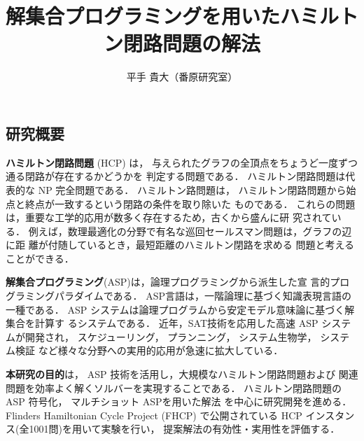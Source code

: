 \documentclass[a4j,10pt]{jarticle}
\title{解集合プログラミングを用いたハミルトン閉路問題の解法}
\author{平手 貴大（番原研究室）}
\date{}
\begin{document}
\maketitle
\thispagestyle{empty}
\begin{multicols}{1}

\section{研究概要}
\textbf{ハミルトン閉路問題} (HCP) は，
与えられたグラフの全頂点をちょうど一度ずつ通る閉路が存在するかどうかを
判定する問題である．
ハミルトン閉路問題は代表的な NP 完全問題である．
ハミルトン路問題は，
ハミルトン閉路問題から始点と終点が一致するという閉路の条件を取り除いた
ものである．
これらの問題は，重要な工学的応用が数多く存在するため，古くから盛んに研
究されている．
例えば，数理最適化の分野で有名な巡回セールスマン問題は，グラフの辺に距
離が付随しているとき，最短距離のハミルトン閉路を求める
問題と考えることができる．

\textbf{解集合プログラミング}(ASP)は，論理プログラミングから派生した宣
言的プログラミングパラダイムである．
ASP言語は，一階論理に基づく知識表現言語の一種である．
ASP システムは論理プログラムから安定モデル意味論に基づく解集合を計算す
るシステムである．
近年，SAT技術を応用した高速 ASP システムが開発され，
スケジューリング，
プランニング，
システム生物学，
システム検証
など様々な分野への実用的応用が急速に拡大している．

\textbf{本研究の目的}は，
ASP 技術を活用し，大規模なハミルトン閉路問題および
関連問題を効率よく解くソルバーを実現することである．
ハミルトン閉路問題の ASP 符号化，
マルチショット ASPを用いた解法
を中心に研究開発を進める．
Flinders Hamiltonian Cycle Project (FHCP) で公開されている
HCP インスタンス(全1001問)を用いて実験を行い，
提案解法の有効性・実用性を評価する．


\end{multicols}
\end{document}

